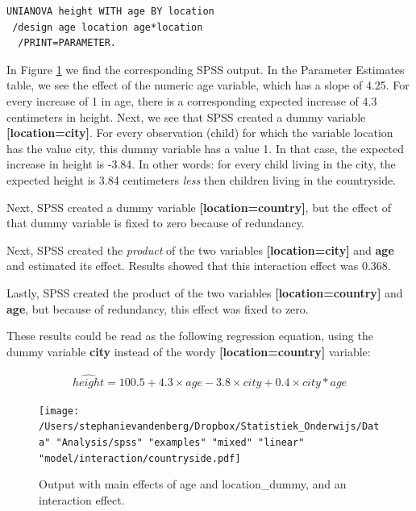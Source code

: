\documentclass[]{book}\usepackage[]{graphicx}\usepackage[]{color}
\begin{document}
\begin{verbatim}
UNIANOVA height WITH age BY location
 /design age location age*location
  /PRINT=PARAMETER.
\end{verbatim}


In Figure \ref{fig:interactionheight} we find the corresponding SPSS output. In the Parameter Estimates table, we see the effect of the numeric age variable, which has a slope of 4.25. For every increase of 1 in age, there is a corresponding expected increase of 4.3 centimeters in height. Next, we see that SPSS created a dummy variable \textbf{[location=city]}. For every observation (child) for which the variable location has the value city, this dummy variable has a value 1. In that case, the expected increase in height is -3.84. In other words: for every child living in the city, the expected height is 3.84 centimeters \textit{less} then children living in the countryside. 

Next, SPSS created a dummy variable \textbf{[location=country]}, but the effect of that dummy variable is fixed to zero because of redundancy.

Next, SPSS created the \textit{product} of the two variables \textbf{[{location=city}]} and \textbf{age} and estimated its effect. Results showed that this interaction effect was 0.368.  

Lastly, SPSS created the product of the two variables \textbf{[{location=country}]} and \textbf{age}, but because of redundancy, this effect was fixed to zero.

These results could be read as the following regression equation, using the dummy variable \textbf{city} instead of the wordy \textbf{[{location=country}]} variable:

\begin{eqnarray}
\widehat{height} = 100.5  + 4.3  \times age -3.8 \times city + 0.4 \times city*age 
\end{eqnarray}





\begin{figure}[h]
    \begin{center}
       \texttt{[image: /Users/stephanievandenberg/Dropbox/Statistiek\_Onderwijs/Data" "Analysis/spss" "examples" "mixed" "linear" "model/interaction/countryside.pdf]}
    \end{center}
    \label{fig:interactionheight}
    \caption{Output with main effects of age and location\_dummy, and an interaction effect.}
\end{figure}
\end{document}
